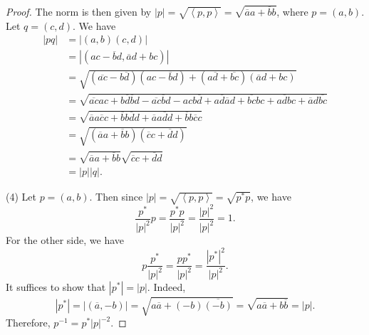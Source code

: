 \documentclass[11pt, letterpaper]{article}
\theoremstyle{plain}
\begin{document}
\begin{proof}
	The norm is then given by $\left| p \right| =\sqrt{\left\langle p,p \right\rangle } =\sqrt{\overline{a} a+\overline{b} b} $, where $p=(a,b)$. Let $q=(c,d)$. We have
	\begin{align*}
		\left| pq \right| &=\left| (a,b)(c,d) \right| \\
				  &=\left| (ac- \overline{b} d, \overline{a} d+bc) \right| \\
				  &=\sqrt{\left( \overline{ac} -b \overline{d}  \right) \left( ac- \overline{b} d \right) +\left( a \overline{d} + \overline{bc}  \right) \left( \overline{a} d+bc \right) } \\
				  &=\sqrt{\overline{ac} ac +b \overline{d} \overline{b} d - \overline{ac} \overline{b} d- acb \overline{d} +a \overline{d} \overline{a} d+ \overline{bc} bc + a \overline{d} bc + \overline{a} d \overline{bc} } \\
				  &=\sqrt{\overline{a} a \overline{c} c + \overline{b} b \overline{d} d + \overline{a} a \overline{d} d + \overline{b} b \overline{c} c} \\
				  &=\sqrt{\left( \overline{a} a+ \overline{b} b \right) \left( \overline{c} c+\overline{d} d \right) } \\
				  &=\sqrt{\overline{a} a+ \overline{b} b} \sqrt{\overline{c} c+ \overline{d} d} \\
				  &=\left| p \right| \left| q \right| 
	.\end{align*}

	(4) Let $p=(a,b)$. Then since $\left| p \right| =\sqrt{\left\langle p,p \right\rangle }=\sqrt{p^*p} $, we have
	\[
		\frac{p^*}{\left| p \right| ^2}p =\frac{p^*p}{\left| p \right|^2} =\frac{\left| p \right| ^2}{\left| p \right| ^2} =1
	.\]
	For the other side, we have
	\[
		p \frac{p^*}{\left| p \right| ^2} =\frac{pp^*}{\left| p \right| ^2} =\frac{\left| p^* \right| ^2}{\left| p \right| ^2} 
	.\]
	It suffices to show that $\left| p^* \right| =\left| p \right| $. Indeed,
	\[
		\left| p^* \right| =\left| (\overline{a} ,-b) \right| =\sqrt{a \overline{a} +(-b) \overline{(-b)} } =\sqrt{a \overline{a} +b \overline{b} } =\left| p \right| 
	.\]
	Therefore, $p ^{-1} =p^* \left| p \right| ^{-2} $.


\end{proof}
\end{document}
